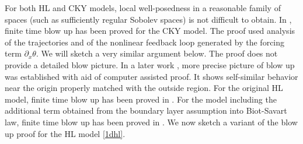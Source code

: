 \documentclass[reqno,centertags, 11pt]{amsart}
\begin{document}
For both HL and CKY models, local well-posedness in a reasonable family of spaces (such as sufficiently regular Sobolev spaces) is not
difficult to obtain. In \cite{CKY}, finite time blow up has been proved for the CKY model. The proof used analysis of the trajectories
and of the nonlinear feedback loop generated by the forcing term $\partial_x \theta$. We will sketch a very similar argument below. The proof does not provide
a detailed blow picture. In a later work \cite{LH}, more precise picture of blow up was established with aid of computer
assisted proof. It shows self-similar  behavior near the origin properly matched with the outside region. For the original HL model, finite
time blow up has been proved in \cite{CHKLSY}. For the model including the additional term obtained from the boundary layer assumption
into Biot-Savart law, finite time blow up has been proved in \cite{DKX}. We now sketch a variant of the blow up proof for the HL model \eqref{1dhl}.
\end{document}
